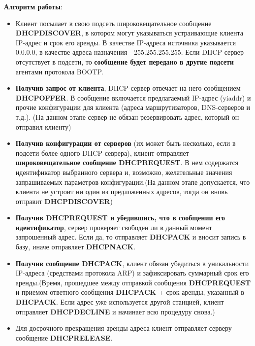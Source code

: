 \textbf{Алгоритм работы}:
\begin{itemize}
    \item Клиент посылает в свою подсеть широковещательное сообщение \textbf{DHCPDISCOVER}, в котором могут указываться устраивающие клиента IP-адрес и срок его аренды. В качестве IP-адреса источника указывается 0.0.0.0, в качестве адреса назначения - 255.255.255.255. Если DHCP-сервер отсутствует в подсети, то \textbf{сообщение будет передано в другие подсети} агентами протокола BOOTP.
    \item \textbf{Получив запрос от клиента}, DHCP-сервер отвечает на него сообщением \textbf{DHCPOFFER}. В сообщение включается предлагаемый IP-адрес (yiaddr) и прочие конфигурации для клиента (адреса маршрутизаторов, DNS-серверов и т.д.). (На данном этапе сервер не обязан резервировать адрес, который он отправил клиенту)
    \item \textbf{Получив конфигурации от серверов} (их может быть несколько, если в подсети более одного DHCP-севрера), клиент отправляет \textbf{широковещательное сообщение DHCPREQUEST}. В нем содержатся идентификатор выбранного сервера и, возможно, желательные значения запрашиваемых параметров конфигурации.(На данном этапе допускается, что клиента не устроит ни один из предложенных адресов, тогда он вновь отправит \textbf{DHCPDISCOVER})
    \item  \textbf{Получив DHCPREQUEST и убедившись, что в сообщении его идентификатор}, сервер проверяет свободен ли в данный момент запрошенный адрес. Если да, то отправляет \textbf{DHCPACK} и вносит запись в базу, иначе отправляет \textbf{DHCPNACK}.
    \item \textbf{Получив сообщение DHCPACK}, клиент обязан убедиться в уникальности IP-адреса (средствами протокола ARP) и зафиксировать суммарный срок его аренды.(Время, прошедшее между отправкой сообщения \textbf{DHCPREQUEST} и приемом ответного сообщения \textbf{DHCPACK} + срок аренды, указанный в \textbf{DHCPACK}.
    Если адрес уже используется другой станцией, клиент отправляет \textbf{DHCPDECLINE} и начинает всю процедуру снова.)
    \item Для досрочного прекращения аренды адреса клиент отправляет серверу сообщение \textbf{DHCPRELEASE}.\\
\end{itemize}


